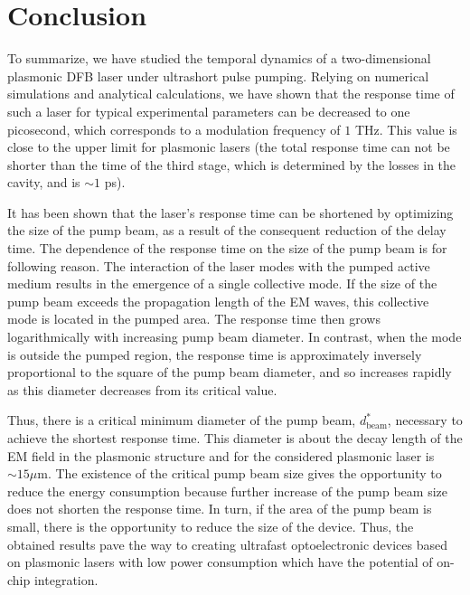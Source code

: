 \documentclass[aps,pra,amsmath,amssymb,onecolumn,superscriptaddress,showpacs,floatfix,]{revtex4-1}
\begin{document}
\section*{Conclusion}

To summarize, we have studied the temporal dynamics of a two-dimensional plasmonic DFB laser under ultrashort pulse pumping.
Relying on numerical simulations and analytical calculations, we have shown that the response time of such a laser for typical experimental parameters can be decreased to one picosecond, which corresponds to a modulation frequency of $1$ THz.
This value is close to the upper limit for plasmonic lasers (the total response time can not be shorter than the time of the third stage, which is determined by the losses in the cavity, and is $ \sim 1$ ps).

It has been shown that the laser's response time can be shortened by optimizing the size of the pump beam, as a result of the consequent reduction of the delay time.
The dependence of the response time on the size of the pump beam is for following reason.
The interaction of the laser modes with the pumped active medium results in the emergence of a single collective mode.
If the size of the pump beam exceeds the propagation length of the EM waves, this collective mode is located in the pumped area.
The response time then grows logarithmically with increasing pump beam diameter.
In contrast, when the mode is outside the pumped region, the response time is approximately inversely proportional to the square of the pump beam diameter, and so increases rapidly as this diameter decreases from its critical value.

Thus, there is a critical minimum diameter of the pump beam, $d_{\text{beam}}^*$, necessary to achieve the shortest response time. This diameter is about the decay length of the EM field in the plasmonic structure and for the considered plasmonic laser is $\sim 15 \mu$m. The existence of the critical pump beam size gives the opportunity to reduce the energy consumption because further increase of the pump beam size does not shorten the response time.
In turn, if the area of the pump beam is small, there is the opportunity to reduce the size of the device.
Thus, the obtained results pave the way to creating ultrafast optoelectronic devices based on plasmonic lasers with low power consumption which have the potential of on-chip integration.
\end{document}
